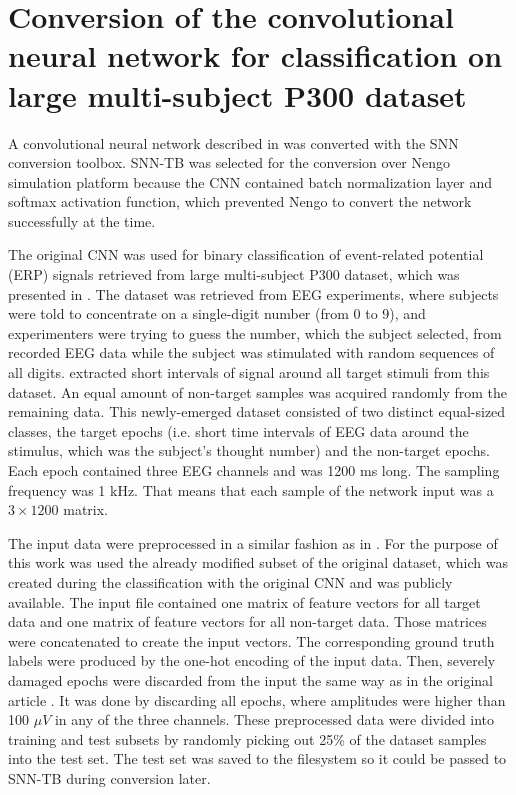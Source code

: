 \chapter{Conversion of the convolutional neural network for classification on large multi-subject P300 dataset} \label{chap:06}

A convolutional neural network described in \cite{varekaEvaluationConvolutional20} was converted with the SNN conversion toolbox. SNN-TB was selected for the conversion over Nengo simulation platform because the CNN contained batch normalization layer and softmax activation function, which prevented Nengo to convert the network successfully at the time. \par
The original CNN was used for binary classification of event-related potential (ERP) signals retrieved from large multi-subject P300 dataset, which was presented in \cite{moucekEventrelatedPotential17}. The dataset was retrieved from EEG experiments, where subjects were told to concentrate on a single-digit number (from 0 to 9), and experimenters were trying to guess the number, which the subject selected, from recorded EEG data while the subject was stimulated with random sequences of all digits. \cite{varekaEvaluationConvolutional20} extracted short intervals of signal around all target stimuli from this dataset. An equal amount of non-target samples was acquired randomly from the remaining data. This newly-emerged dataset consisted of two distinct equal-sized classes, the target epochs (i.e. short time intervals of EEG data around the stimulus, which was the subject's thought number) and the non-target epochs. Each epoch contained three EEG channels and was 1200 ms long. The sampling frequency was 1 kHz. That means that each sample of the network input was a $3 \times 1200$ matrix. \par
The input data were preprocessed in a similar fashion as in \cite{varekaEvaluationConvolutional20}. For the purpose of this work was used the already modified subset \cite{moucekReplicationData19} of the original dataset, which was created during the classification with the original CNN and was publicly available. The input file contained one matrix of feature vectors for all target data and one matrix of feature vectors for all non-target data. Those matrices were concatenated to create the input vectors. The corresponding ground truth labels were produced by the one-hot encoding of the input data. Then, severely damaged epochs were discarded from the input the same way as in the original article \cite{varekaEvaluationConvolutional20}. It was done by discarding all epochs, where amplitudes were higher than 100 $\mu V$ in any of the three channels. These preprocessed data were divided into training and test subsets by randomly picking out 25\% of the dataset samples into the test set. The test set was saved to the filesystem so it could be passed to SNN-TB during conversion later. \par
